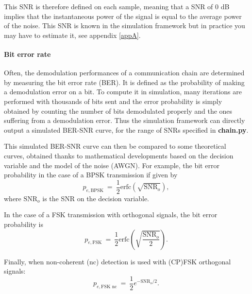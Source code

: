 This SNR is therefore defined on each sample, meaning that a SNR of 0 dB implies that the instantaneous power of the signal is equal to the average power of the noise. This SNR is known in the simulation framework but in practice you may have to estimate it, see appendix \ref{appA}.




\paragraph{Bit error rate}
Often, the demodulation performances of a communication chain are determined by measuring the bit error rate (BER). It is defined as the probability of making a demodulation error on a bit. To compute it in simulation, many iterations are performed with thousands of bits sent and the error probability is simply obtained by counting the number of bits demodulated properly and the ones suffering from a demodulation error. Thus the simulation framework can directly output a simulated BER-SNR curve, for the range of SNRs specified in \textbf{chain.py}.

This simulated BER-SNR curve can then be compared to some theoretical curves, obtained thanks to mathematical developments based on the decision variable and the model of the noise (AWGN). For example, the bit error probability in the case of a BPSK transmission if given by
\begin{equation*}
    p_{e,\text{BPSK}}\:=\:\frac{1}{2} \text{erfc}\left(\sqrt{\text{SNR}_o}\right),
\end{equation*}
where $\text{SNR}_o$ is the SNR on the decision variable.

In the case of a FSK transmission with orthogonal signals, the bit error probability is
\begin{equation*}
    p_{e,\text{FSK}}\:=\:\frac{1}{2} \text{erfc}\left(\sqrt{\frac{\text{SNR}_o}{2}}\right).
\end{equation*}

Finally, when non-coherent (nc) detection is used with (CP)FSK orthogonal signals:
\begin{equation*}
    p_{e,\text{FSK nc}}\:=\:\frac{1}{2}e^{-\text{SNR}_o/2}.
\end{equation*}

